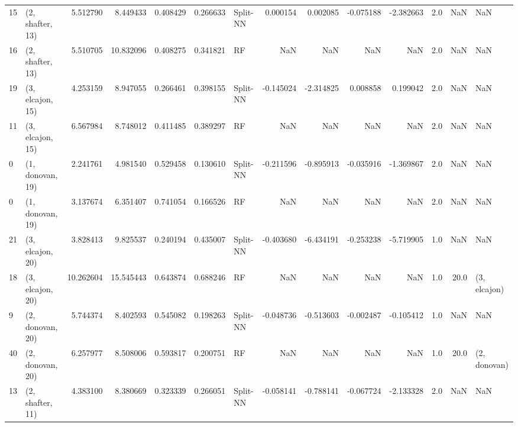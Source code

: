 \begin{tabular}{llrrrrlrrrrrrl}
15 &  (2, shafter, 13) &   5.512790 &   8.449433 &   0.408429 &  0.266633 &    Split-NN &        0.000154 &      0.002085 &      -0.075188 &    -2.382663 &            2.0 &    NaN &              NaN \\
16 &  (2, shafter, 13) &   5.510705 &  10.832096 &   0.408275 &  0.341821 &          RF &             NaN &           NaN &            NaN &          NaN &            2.0 &    NaN &              NaN \\
19 &  (3, elcajon, 15) &   4.253159 &   8.947055 &   0.266461 &  0.398155 &    Split-NN &       -0.145024 &     -2.314825 &       0.008858 &     0.199042 &            2.0 &    NaN &              NaN \\
11 &  (3, elcajon, 15) &   6.567984 &   8.748012 &   0.411485 &  0.389297 &          RF &             NaN &           NaN &            NaN &          NaN &            2.0 &    NaN &              NaN \\
0  &  (1, donovan, 19) &   2.241761 &   4.981540 &   0.529458 &  0.130610 &    Split-NN &       -0.211596 &     -0.895913 &      -0.035916 &    -1.369867 &            2.0 &    NaN &              NaN \\
0  &  (1, donovan, 19) &   3.137674 &   6.351407 &   0.741054 &  0.166526 &          RF &             NaN &           NaN &            NaN &          NaN &            2.0 &    NaN &              NaN \\
21 &  (3, elcajon, 20) &   3.828413 &   9.825537 &   0.240194 &  0.435007 &    Split-NN &       -0.403680 &     -6.434191 &      -0.253238 &    -5.719905 &            1.0 &    NaN &              NaN \\
18 &  (3, elcajon, 20) &  10.262604 &  15.545443 &   0.643874 &  0.688246 &          RF &             NaN &           NaN &            NaN &          NaN &            1.0 &   20.0 &     (3, elcajon) \\
9  &  (2, donovan, 20) &   5.744374 &   8.402593 &   0.545082 &  0.198263 &    Split-NN &       -0.048736 &     -0.513603 &      -0.002487 &    -0.105412 &            1.0 &    NaN &              NaN \\
40 &  (2, donovan, 20) &   6.257977 &   8.508006 &   0.593817 &  0.200751 &          RF &             NaN &           NaN &            NaN &          NaN &            1.0 &   20.0 &     (2, donovan) \\
13 &  (2, shafter, 11) &   4.383100 &   8.380669 &   0.323339 &  0.266051 &    Split-NN &       -0.058141 &     -0.788141 &      -0.067724 &    -2.133328 &            2.0 &    NaN &              NaN \\

\end{tabular}
